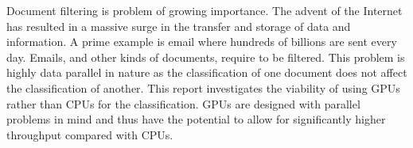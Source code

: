 Document filtering is problem of growing importance. The advent of the Internet
has resulted in a massive surge in the transfer and storage of data and
information. A prime example is email where hundreds of billions are sent every
day. Emails, and other kinds of documents, require to be filtered. This problem
is highly data parallel in nature as the classification of one document does
not affect the classification of another. This report investigates the viability
of using GPUs rather than CPUs for the classification. GPUs are designed with
parallel problems in mind and thus have the potential to allow for significantly
higher throughput compared with CPUs.
